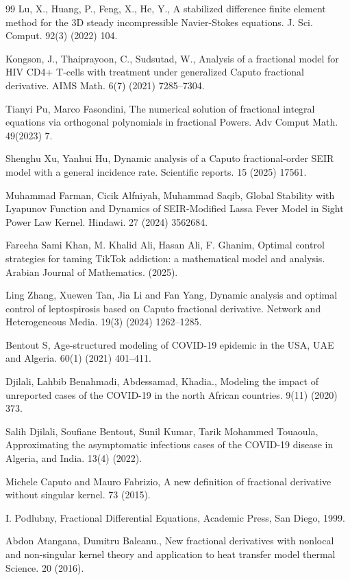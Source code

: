\documentclass[10pt]{NSP1}
\begin{document}
\begin{thebibliography}{99}
Lu, X., Huang, P., Feng, X., He, Y., A stabilized difference finite element method for the 3D steady incompressible Navier-Stokes equations. J. Sci. Comput. 92(3) (2022) 104.

Kongson, J., Thaiprayoon, C., Sudsutad, W., Analysis of a fractional model for HIV CD4+ T-cells with treatment under generalized Caputo fractional derivative. AIMS Math. 6(7) (2021) 7285–7304.

Tianyi Pu, Marco Fasondini, The numerical solution of fractional integral equations via orthogonal polynomials in fractional Powers. Adv Comput Math. 49(2023) 7.

Shenghu Xu, Yanhui Hu, Dynamic analysis of a Caputo fractional-order SEIR model with a general incidence rate. Scientific reports. 15 (2025) 17561.

Muhammad Farman, Cicik Alfniyah, Muhammad Saqib, Global Stability with Lyapunov Function and Dynamics of SEIR-Modified Lassa Fever Model in Sight Power Law Kernel. Hindawi. 27 (2024) 3562684.

Fareeha Sami Khan, M. Khalid Ali, Hasan Ali, F. Ghanim, Optimal control strategies for taming TikTok addiction: a mathematical model and analysis. Arabian Journal of Mathematics. (2025).

Ling Zhang, Xuewen Tan, Jia Li and Fan Yang, Dynamic analysis and optimal control of leptospirosis based on Caputo fractional derivative. Network and Heterogeneous Media. 19(3) (2024) 1262–1285.

Bentout S, Age-structured modeling of COVID-19 epidemic in the USA, UAE and Algeria. 60(1) (2021) 401–411.

Djilali, Lahbib Benahmadi, Abdessamad, Khadia., Modeling the impact of unreported cases of the COVID-19 in the north African countries. 9(11) (2020) 373.

Salih Djilali, Soufiane Bentout, Sunil Kumar, Tarik Mohammed Touaoula, Approximating the asymptomatic infectious cases of the COVID-19 disease in Algeria, and India. 13(4) (2022).

Michele Caputo and Mauro Fabrizio, A new definition of fractional derivative without singular kernel. 73 (2015).

I. Podlubny, Fractional Differential Equations, Academic Press, San Diego, 1999.

Abdon Atangana, Dumitru Baleanu., New fractional derivatives with nonlocal and non-singular kernel theory and application to heat transfer model thermal Science. 20 (2016).


\end{thebibliography}
\end{document}
